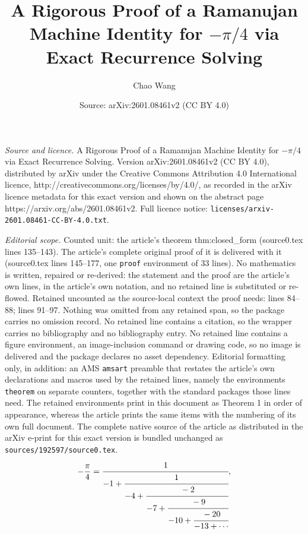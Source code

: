 \documentclass[10pt,a4paper]{amsart}
\title{A Rigorous Proof of a Ramanujan Machine Identity for $-\pi/4$ via Exact Recurrence Solving}
\author{Chao Wang}
\date{Source: arXiv:2601.08461v2 (CC BY 4.0)}
\begin{document}
\maketitle

\noindent\emph{Source and licence.} A Rigorous Proof of a Ramanujan Machine Identity for $-\pi/4$ via Exact Recurrence Solving. Version arXiv:2601.08461v2 (CC BY 4.0), distributed by arXiv under the Creative Commons Attribution 4.0 International licence, http://creativecommons.org/licenses/by/4.0/, as recorded in the arXiv licence metadata for this exact version and shown on the abstract page https://arxiv.org/abs/2601.08461v2. Full licence notice: \texttt{licenses/arxiv-2601.08461-CC-BY-4.0.txt}.\par\smallskip

\noindent\textit{Editorial scope.} Counted unit: the article's theorem thm:closed\_form (source0.tex lines 135--143). The article's complete original proof of it is delivered with it (source0.tex lines 145--177, one \texttt{proof} environment of 33 lines). No mathematics is written, repaired or re-derived: the statement and the proof are the article's own lines, in the article's own notation, and no retained line is substituted or re-flowed.  Retained uncounted as the source-local context the proof needs: lines 84--88; lines 91--97.  Nothing was omitted from any retained span, so the package carries no omission record.  No retained line contains a citation, so the wrapper carries no bibliography and no bibliography entry.  No retained line contains a figure environment, an image-inclusion command or drawing code, so no image is delivered and the package declares no asset dependency.  Editorial formatting only, in addition: an AMS \texttt{amsart} preamble that restates the article's own declarations and macros used by the retained lines, namely the environments \texttt{theorem} on separate counters, together with the standard packages those lines need.  The retained environments print in this document as Theorem 1 in order of appearance, whereas the article prints the same items with the numbering of its own full document.  The complete native source of the article as distributed in the arXiv e-print for this exact version is bundled unchanged as \texttt{sources/192597/source0.tex}.
  \begin{equation}\label{eq:conjecture}
    -\frac{\pi}{4}
    = \cfrac{1}{-1 + \cfrac{1}{-4 + \cfrac{-2}{-7 + \cfrac{-9}{-10
          + \cfrac{-20}{-13 + \cdots}}}}},
  \end{equation}
\end{document}
